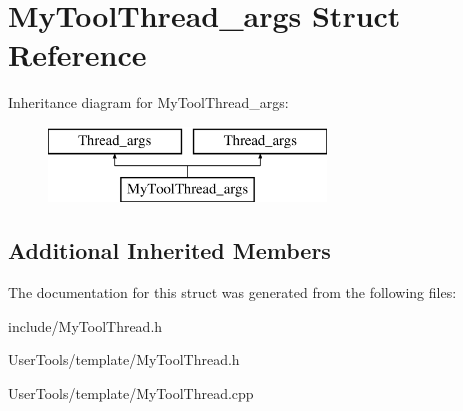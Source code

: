 \hypertarget{structMyToolThread__args}{\section{My\-Tool\-Thread\-\_\-args Struct Reference}
\label{structMyToolThread__args}
}
Inheritance diagram for My\-Tool\-Thread\-\_\-args\-:\begin{figure}[H]
\begin{center}
\leavevmode
\includegraphics[height=2.000000cm]{structMyToolThread__args}
\end{center}
\end{figure}
\subsection*{Additional Inherited Members}


The documentation for this struct was generated from the following files\-:\begin{DoxyCompactItemize}
\item 
include/My\-Tool\-Thread.\-h\item 
User\-Tools/template/My\-Tool\-Thread.\-h\item 
User\-Tools/template/My\-Tool\-Thread.\-cpp\end{DoxyCompactItemize}
